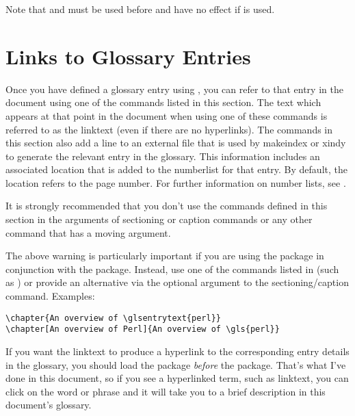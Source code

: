 \documentclass[report]{nlctdoc}
\begin{document}
\begin{important}
Note that  and  must be used 
before  and have no effect if  is 
used.
\end{important}


\chapter{Links to Glossary Entries}
\label{sec:glslink}

Once you have defined a glossary entry using ,
you can refer to that entry in the document using one of the
commands listed in this section. The text which appears at that
point in the document when using one of these commands is referred
to as the \gls{linktext} (even if there are no hyperlinks). The
commands in this section also add a line to an external file that is
used by \gls{makeindex} or \gls{xindy} to generate the relevant
entry in the glossary. This information includes an associated
location that is added to the \gls{numberlist} for that entry. By
default, the location refers to the page number. For further
information on number lists, see .

\begin{important}
It is strongly recommended that you don't use the commands
defined in this section in the arguments of sectioning or caption
commands or any other command that has a moving argument.
\end{important}

The above warning is particularly important if you are using the
 package in conjunction with the 
package. Instead, use one of the commands listed in
 (such as ) or provide an
alternative via the optional argument to the sectioning/caption
command. Examples:
\begin{verbatim}
\chapter{An overview of \glsentrytext{perl}}
\chapter[An overview of Perl]{An overview of \gls{perl}}
\end{verbatim}

If you want the \gls{linktext} to produce a hyperlink to the
corresponding entry details in the glossary, you should load the
 package \emph{before} the 
package. That's what I've done in this document, so if you see a
hyperlinked term, such as \gls{linktext}, you can click on the word
or phrase and it will take you to a brief description in this
document's glossary.
\end{document}
